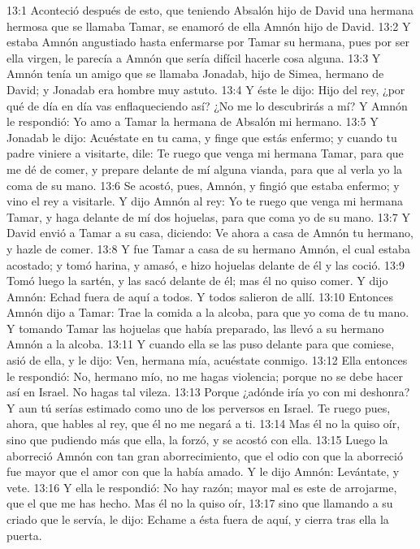 13:1 Aconteció después de esto, que teniendo Absalón hijo de David una hermana hermosa que se llamaba Tamar, se enamoró de ella Amnón hijo de David.  
13:2 Y estaba Amnón angustiado hasta enfermarse por Tamar su hermana, pues por ser ella virgen, le parecía a Amnón que sería difícil hacerle cosa alguna.  
13:3 Y Amnón tenía un amigo que se llamaba Jonadab, hijo de Simea, hermano de David; y Jonadab era hombre muy astuto.  
13:4 Y éste le dijo: Hijo del rey, ¿por qué de día en día vas enflaqueciendo así? ¿No me lo descubrirás a mí? Y Amnón le respondió: Yo amo a Tamar la hermana de Absalón mi hermano.  
13:5 Y Jonadab le dijo: Acuéstate en tu cama, y finge que estás enfermo; y cuando tu padre viniere a visitarte, dile: Te ruego que venga mi hermana Tamar, para que me dé de comer, y prepare delante de mí alguna vianda, para que al verla yo la coma de su mano.  
13:6 Se acostó, pues, Amnón, y fingió que estaba enfermo; y vino el rey a visitarle. Y dijo Amnón al rey: Yo te ruego que venga mi hermana Tamar, y haga delante de mí dos hojuelas, para que coma yo de su mano.  
13:7 Y David envió a Tamar a su casa, diciendo: Ve ahora a casa de Amnón tu hermano, y hazle de comer.  
13:8 Y fue Tamar a casa de su hermano Amnón, el cual estaba acostado; y tomó harina, y amasó, e hizo hojuelas delante de él y las coció.  
13:9 Tomó luego la sartén, y las sacó delante de él; mas él no quiso comer. Y dijo Amnón: Echad fuera de aquí a todos. Y todos salieron de allí.  
13:10 Entonces Amnón dijo a Tamar: Trae la comida a la alcoba, para que yo coma de tu mano. Y tomando Tamar las hojuelas que había preparado, las llevó a su hermano Amnón a la alcoba.  
13:11 Y cuando ella se las puso delante para que comiese, asió de ella, y le dijo: Ven, hermana mía, acuéstate conmigo.  
13:12 Ella entonces le respondió: No, hermano mío, no me hagas violencia; porque no se debe hacer así en Israel. No hagas tal vileza.  
13:13 Porque ¿adónde iría yo con mi deshonra? Y aun tú serías estimado como uno de los perversos en Israel. Te ruego pues, ahora, que hables al rey, que él no me negará a ti.  
13:14 Mas él no la quiso oír, sino que pudiendo más que ella, la forzó, y se acostó con ella.  
13:15 Luego la aborreció Amnón con tan gran aborrecimiento, que el odio con que la aborreció fue mayor que el amor con que la había amado. Y le dijo Amnón: Levántate, y vete.  
13:16 Y ella le respondió: No hay razón; mayor mal es este de arrojarme, que el que me has hecho. Mas él no la quiso oír,  
13:17 sino que llamando a su criado que le servía, le dijo: Echame a ésta fuera de aquí, y cierra tras ella la puerta.  
